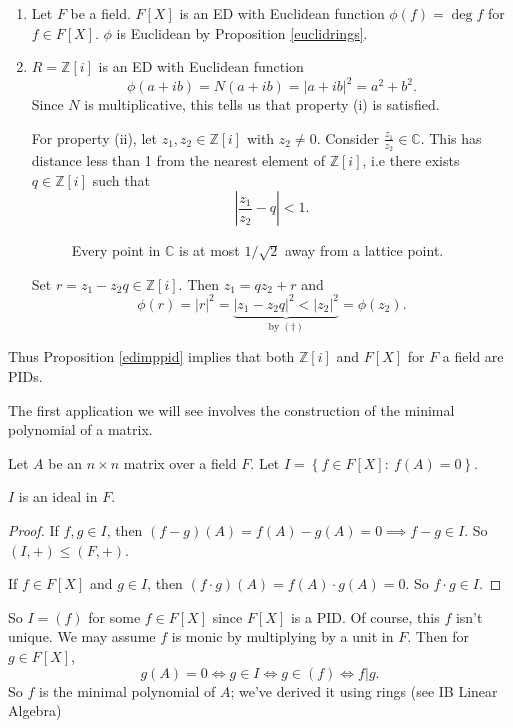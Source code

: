 \documentclass[egregdoesnotlikesansseriftitles,a4paper]{scrartcl}
\begin{document}
\begin{example*}
      \begin{enumerate}
            \item Let $F$ be a field. $F[X]$ is an ED with Euclidean function $\phi (f)=\operatorname{deg} f$ for $f \in F[X]$. $\phi$ is Euclidean by Proposition \ref{euclidrings}.
            \item $R=\mathbb{Z}[i]$ is an ED with Euclidean function \[
                  \phi (a+ib )=N (a+ib)= \left|a+ib \right|^2 =a^2+b^2
            .\] 
             Since $N$ is multiplicative, this tells us that property (i) is satisfied. 

            For property (ii), let $z_1 , z_2 \in \mathbb{Z}[i]$ with $z_2 \neq 0$. Consider $\frac{z_1}{z_2 } \in \mathbb{C}$. This has distance less than 1 from the nearest element of $\mathbb{Z}[i]$, i.e there exists $q \in \mathbb{Z}[i]$ such that
            \begin{equation}\tag{$\dagger$}
                  \left|\frac{z_1}{z_2 }-q\right|<1.
            \end{equation}
            \begin{figure}[H]
                  \centering
                  \caption{Every point in $\mathbb{C}$ is at most $1/\sqrt{2}$ away from a lattice point.}
            \end{figure}
            Set $r=z_1 -z_2 q \in \mathbb{Z}[i]$. Then $z_1 =qz_2 +r$ and \[
            \phi (r)=\left|r\right|^2= \underbrace{\left|z_1 -z_2 q\right|^2<\left|z_2 \right|^2 }_{\text{by } (\dagger)} =\phi (z_2 )
            .\]
      \end{enumerate}
      Thus Proposition \ref{edimppid} implies that both $\mathbb{Z}[i]$ and $F[X]$ for $F$ a field are PIDs.
\end{example*}
The first application we will see involves the construction of the minimal polynomial of a matrix.
\begin{example*}
       Let $A$ be an $n \times n$ matrix over a field $F$. Let $I=\left\{f \in F[X]: \ f (A)=0\right\}$. 
       \begin{claim}
             $I$ is an ideal in $F$.
       \end{claim}
       \begin{proof}
              If $f,g \in I$, then $(f-g)(A)=f (A)- g (A)=0 \implies f-g \in I$. So $(I,+)\leq (F,+)$. 
              
              If $f \in F[X]$ and $g \in I$, then $(f \cdot g)(A)=f (A)\cdot g (A)=0$. So $f \cdot g \in I$.
       \end{proof}
       So $I = (f)$ for some $f \in F[X]$ since $F[X]$ is a PID. Of course, this $f$ isn't unique. We may assume $f$ is monic by multiplying by a unit in $F$. Then for $g \in F[X]$, \[
            g (A)=0 \iff g \in I \iff g \in (f) \iff f|g
       .\] So $f$ is the minimal polynomial of $A$; we've derived it using rings (see IB Linear Algebra)
\end{example*}
\end{document}
